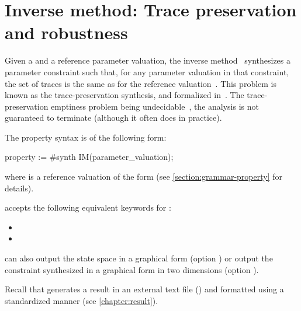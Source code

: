 \section{Inverse method: Trace preservation and robustness}\label{section:algorithm:IM}

Given a \NIPTA{} and a reference parameter valuation, the inverse method~\IM{} synthesizes a parameter constraint such that, for any parameter valuation in that constraint, the set of traces is the same as for the reference valuation~\cite{ACEF09}.
This problem is known as the trace-preservation synthesis, and formalized in~\cite{ALM20}.
The trace-preservation emptiness problem being undecidable~\cite{ALM20}, the analysis is not guaranteed to terminate (although it often does in practice).

The property syntax is of the following form:

\begin{IMITATORproperty}
property := #synth IM(parameter_valuation);
\end{IMITATORproperty}

\noindent{}
where  is a reference valuation of the form  (see \cref{section:grammar-property} for details).

\begin{syntaxalias}
	\imitator{} accepts the following equivalent keywords for :
	\begin{itemize}
		\item {}
		\item {}
	\end{itemize}
\end{syntaxalias}


\imitator{} can also output the state space in a graphical form (option )
or
output the constraint synthesized in a graphical form in two dimensions (option ).

Recall that \imitator{} %
generates
a result in an external text file () and formatted using a standardized manner (see \cref{chapter:result}). %


